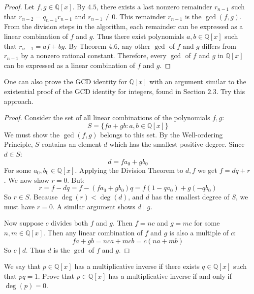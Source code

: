 \begin{proof}
    Let $f, g \in \mathbb{Q}[x]$.
    By $4.5$, there exists a last nonzero remainder 
        $r_{n-1}$ such that $r_{n-2} = q_{n-1} r_{n-1}$ and $r_{n-1} \ne 0$.
    This remainder $r_{n-1}$ is the $\gcd(f, g)$.
    From the division steps in the algorithm, each remainder can be expressed 
        as a linear combination of $f$ and $g$.
    Thus there exist polynomials $a, b \in \mathbb{Q}[x]$ such that 
        $r_{n-1} = af + bg$.
    By Theorem $4.6$, any other $\gcd$ of $f$ and $g$ differs from $r_{n-1}$ 
        by a nonzero rational constant.
    Therefore, every $\gcd$ of $f$ and $g$ in $\mathbb{Q}[x]$ can be expressed 
        as a linear combination of $f$ and $g$.
\end{proof}

\begin{tcolorbox}[title=Problem 9, breakable]
    One can also prove the GCD identity for $\mathbb{Q}[x]$ with an argument 
    similar to the existential proof of the GCD identity for integers,
    found in Section $2.3$. Try this approach.
\end{tcolorbox}

\begin{proof}
    Consider the set of all linear combinations of the polynomials $f, g$:
    \[
    S = \{ f a + g b : a, b \in \mathbb{Q}[x] \}
    \]
    We must show the $\gcd(f, g)$ belongs to this set.
    By the Well-ordering Principle, $S$ contains an element $d$
    which has the smallest positive degree.
    Since $d \in S$:
    \[
    d = f a_0 + g b_0
    \]
    For some $a_0, b_0 \in \mathbb{Q}[x]$.
    Applying the Division Theorem to $d, f$
    we get $f = d q + r$.
    We now show $r = 0$.
    But:
    \[
    r = f - d q = f - (f a_0 + g b_0) q = f (1 - q a_0) + g(-q b_0)
    \]
    So $r \in S$. Because $\deg(r) < \deg(d)$, and $d$ has the smallest degree 
    of $S$, we must have $r = 0$.
    A similar argument shows $d \mid g$.

    Now suppose $c$ divides both $f$ and $g$.
    Then $f = n c$ and $g = m c$ for some $n, m \in \mathbb{Q}[x]$.
    Then any linear combination of $f$ and $g$ is also a multiple of $c$:
    \[
    f a + g b = n c a + m c b = c (n a + m b)
    \]
    So $c \mid d$.
    Thus $d$ is the $\gcd$ of $f$ and $g$.
\end{proof}

\begin{tcolorbox}[title=Problem 10, breakable]
    We say that $p \in \mathbb{Q}[x]$ has a multiplicative inverse 
    if there exists $q \in \mathbb{Q}[x]$ such that $pq = 1$.
    Prove that $p \in \mathbb{Q}[x]$ has a multiplicative inverse 
    if and only if $\deg(p) = 0$.
\end{tcolorbox}

